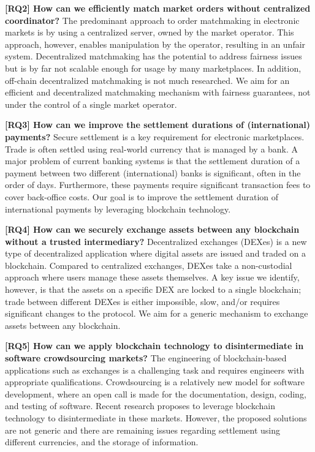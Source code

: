 \textbf{[RQ2] How can we efficiently match market orders without centralized coordinator?}
The predominant approach to order matchmaking in electronic markets is by using a centralized server, owned by the market operator.
This approach, however, enables manipulation by the operator, resulting in an unfair system.
Decentralized matchmaking has the potential to address fairness issues but is by far not scalable enough for usage by many marketplaces.
In addition, off-chain decentralized matchmaking is not much researched.
We aim for an efficient and decentralized matchmaking mechanism with fairness guarantees, not under the control of a single market operator.

\textbf{[RQ3] How can we improve the settlement durations of (international) payments?}
Secure settlement is a key requirement for electronic marketplaces.
Trade is often settled using real-world currency that is managed by a bank.
A major problem of current banking systems is that the settlement duration of a payment between two different (international) banks is significant, often in the order of days.
Furthermore, these payments require significant transaction fees to cover back-office costs.
Our goal is to improve the settlement duration of international payments by leveraging blockchain technology.

\textbf{[RQ4] How can we securely exchange assets between any blockchain without a trusted intermediary?}
Decentralized exchanges (DEXes) is a new type of decentralized application where digital assets are issued and traded on a blockchain.
Compared to centralized exchanges, DEXes take a non-custodial approach where users manage these assets themselves.
A key issue we identify, however, is that the assets on a specific DEX are locked to a single blockchain; trade between different DEXes is either impossible, slow, and/or requires significant changes to the protocol.
We aim for a generic mechanism to exchange assets between any blockchain.

\textbf{[RQ5] How can we apply blockchain technology to disintermediate in software crowdsourcing markets?}
The engineering of blockchain-based applications such as exchanges is a challenging task and requires engineers with appropriate qualifications.
Crowdsourcing is a relatively new model for software development, where an open call is made for the documentation, design, coding, and testing of software.
Recent research proposes to leverage blockchain technology to disintermediate in these markets.
However, the proposed solutions are not generic and there are remaining issues regarding settlement using different currencies, and the storage of information.

